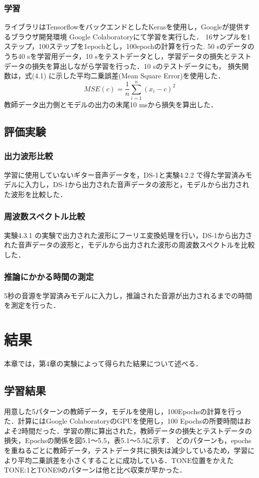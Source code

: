 \documentclass{jreport}		%
\begin{document}
\subsection{学習}
ライブラリはTensorflowをバックエンドとしたKerasを使用し，Googleが提供するブラウザ開発環境 Google Colaboratoryにて学習を実行した．
16サンプルを1ステップ，100ステップを1epochとし，100epochの計算を行った.
50 sのデータのうち40 sを学習用データ，10 sをテストデータとし，学習データの損失とテストデータの損失を算出しながら学習を行った．10 sのテストデータにも，
損失関数は，式(4.1) に示した平均二乗誤差(Mean Square Error)を使用した．
\begin{equation}
  MSE(c) = \frac{1}{n}\sum_{i=1}^{n}(x_i-c)^2
\end{equation}
教師データ出力側とモデルの出力の末尾10 msから損失を算出した．

\section{評価実験}
\subsection{出力波形比較}
学習に使用していないギター音声データを，DS-1と実験4.2.2 で得た学習済みモデルに入力し，DS-1から出力された音声データの波形と，モデルから出力された波形を比較した．

\subsection{周波数スペクトル比較}
実験4.3.1 の実験で出力された波形にフーリエ変換処理を行い，DS-1から出力された音声データの波形と，モデルから出力された波形の周波数スペクトルを比較した．

\subsection{推論にかかる時間の測定}
5秒の音源を学習済みモデルに入力し，推論された音源が出力されるまでの時間を測定を行った．

\chapter{結果}
本章では，第4章の実験によって得られた結果について述べる．

\section{学習結果}
用意した5パターンの教師データ，モデルを使用し，100Epochsの計算を行った．計算にはGoogle ColaboratoryのGPUを使用し，100 Epochsの所要時間はおよそ2時間だった．学習の際に算出された，教師データの損失とテストデータの損失，Epochsの関係を図5.1～5.5，表5.1～5.5に示す．
どのパターンも，epochsを重ねるごとに教師データ，テストデータ共に損失は減少しているため，学習により平均二乗誤差を小さくすることに成功している．TONE位置をかえたTONE:1とTONE9のパターンは他と比べ収束が早かった．
\end{document}
